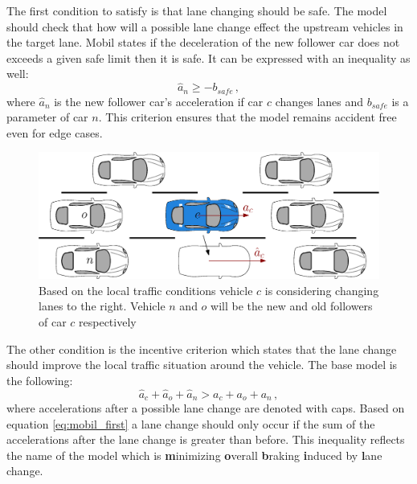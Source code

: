 \documentclass[a4paper,11pt,twoside]{report}
\begin{document}
			The first condition to satisfy is that lane changing should be safe. The model should check that how will a possible lane change effect the upstream vehicles in the target lane. Mobil states if the deceleration of the new follower car does not exceeds a given safe limit then it is safe. It can be expressed with an inequality as well:
			\begin{equation}
				\hat{a}_n\geq -b_{safe}\,,
			\end{equation}
			where $\hat{a}_n$ is the new follower car's acceleration if car $c$ changes lanes and $b_{safe}$ is a parameter of car $n$. This criterion ensures that the model remains accident free even for edge cases.
			\begin{figure}[ht]
				\centering
				\includegraphics[width=\textwidth]{mobil.eps}
				\caption{Based on the local traffic conditions vehicle $c$ is considering changing lanes  to the right. Vehicle $n$ and $o$ will be the new and old followers of car $c$ respectively}
				\label{fig:mobil}
			\end{figure}
			The other condition is the incentive criterion which states that the lane change should improve the local traffic situation around the vehicle.  The base model is the following:
			\begin{equation}
				\hat{a}_c + \hat{a}_o + \hat{a}_n > a_c + a_o + a_n\,,
				\label{eq:mobil_first}
			\end{equation}
			where accelerations after a possible lane change are denoted with caps.
			Based on equation \ref{eq:mobil_first} a lane change should only occur if the sum of the accelerations after the lane change is greater than before. This inequality reflects the name of the model which is \textbf{m}inimizing \textbf{o}verall \textbf{b}raking \textbf{i}nduced by \textbf{l}ane change.
\end{document}
